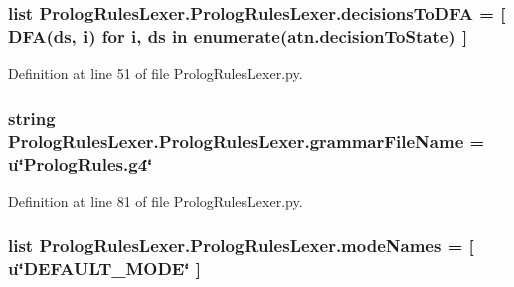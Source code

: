 \subsubsection[{decisions\+To\+D\+F\+A}]{\setlength{\rightskip}{0pt plus 5cm}list Prolog\+Rules\+Lexer.\+Prolog\+Rules\+Lexer.\+decisions\+To\+D\+F\+A = \mbox{[} D\+F\+A(ds, i) for i, ds in enumerate(atn.\+decision\+To\+State) \mbox{]}\hspace{0.3cm}{\ttfamily [static]}}\label{class_prolog_rules_lexer_1_1_prolog_rules_lexer_aa54e09333e7fafa3cde349fa87406924}


Definition at line 51 of file Prolog\+Rules\+Lexer.\+py.

\hypertarget{class_prolog_rules_lexer_1_1_prolog_rules_lexer_ae2c3a72d3fdca809a1dc24859361641b}{}
\subsubsection[{grammar\+File\+Name}]{\setlength{\rightskip}{0pt plus 5cm}string Prolog\+Rules\+Lexer.\+Prolog\+Rules\+Lexer.\+grammar\+File\+Name = u\char`\"{}Prolog\+Rules.\+g4\char`\"{}\hspace{0.3cm}{\ttfamily [static]}}\label{class_prolog_rules_lexer_1_1_prolog_rules_lexer_ae2c3a72d3fdca809a1dc24859361641b}


Definition at line 81 of file Prolog\+Rules\+Lexer.\+py.

\hypertarget{class_prolog_rules_lexer_1_1_prolog_rules_lexer_a85254ebf6e692330044d02a645d16f03}{}
\subsubsection[{mode\+Names}]{\setlength{\rightskip}{0pt plus 5cm}list Prolog\+Rules\+Lexer.\+Prolog\+Rules\+Lexer.\+mode\+Names = \mbox{[} u\char`\"{}D\+E\+F\+A\+U\+L\+T\+\_\+\+M\+O\+D\+E\char`\"{} \mbox{]}\hspace{0.3cm}{\ttfamily [static]}}\label{class_prolog_rules_lexer_1_1_prolog_rules_lexer_a85254ebf6e692330044d02a645d16f03}


